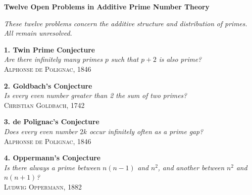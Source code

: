 \begin{center}
  {\Large \textbf{Twelve Open Problems in Additive Prime Number Theory}}

  \vspace{0.5em}
  \textit{These twelve problems concern the additive structure and distribution of primes. All remain unresolved.}

  \vspace{1em}

  \begin{tcolorbox}[
    colback=gray!2,
    colframe=gray!60,
    boxrule=0.4pt,
    width=\textwidth,
    arc=1pt,
    left=6pt,
    right=6pt,
    top=6pt,
    bottom=6pt,
    shadow={0mm}{-0.5mm}{0mm}{gray!40}
  ]

  \noindent\begin{minipage}{0.44\textwidth}
    \textbf{1. Twin Prime Conjecture}\\
    \emph{Are there infinitely many primes \(p\) such that \(p+2\) is also prime?}\\
    \hfill\textsc{Alphonse de Polignac, 1846}
  \end{minipage}\hfill
  \begin{minipage}{0.44\textwidth}
    \textbf{2. Goldbach’s Conjecture}\\
    \emph{Is every even number greater than 2 the sum of two primes?}\\
    \hfill\textsc{Christian Goldbach, 1742}
  \end{minipage}

  \vspace{2em}

  \noindent\begin{minipage}{0.44\textwidth}
    \textbf{3. de Polignac’s Conjecture}\\
    \emph{Does every even number \(2k\) occur infinitely often as a prime gap?}\\
    \hfill\textsc{Alphonse de Polignac, 1846}
  \end{minipage}\hfill
  \begin{minipage}{0.44\textwidth}
    \textbf{4. Oppermann’s Conjecture}\\
    \emph{Is there always a prime between \(n(n - 1)\) and \(n^2\), and another between \(n^2\) and \(n(n + 1)\)?}\\
    \hfill\textsc{Ludwig Oppermann, 1882}
  \end{minipage}

  \vspace{2em}


\end{tcolorbox}
\end{center}
